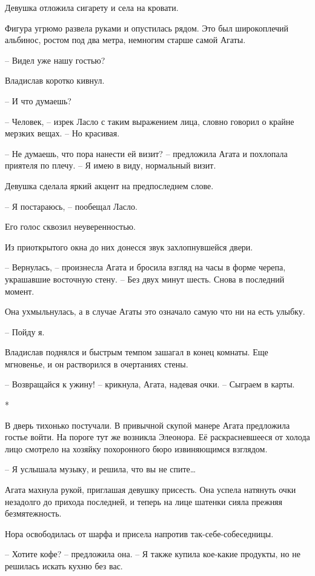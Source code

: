 \documentclass[
  a5paperpaper,
  DIV=11,
  numbers=noendperiod]{scrreprt}
\begin{document}
Девушка отложила сигарету и села на кровати.

Фигура угрюмо развела руками и опустилась рядом. Это был широкоплечий
альбинос, ростом под два метра, немногим старше самой Агаты.

-- Видел уже нашу гостью?

Владислав коротко кивнул.

-- И что думаешь?

-- Человек, -- изрек Ласло с таким выражением лица, словно говорил о
крайне мерзких вещах. -- Но красивая.

-- Не думаешь, что пора нанести ей визит? -- предложила Агата и
похлопала приятеля по плечу. -- Я имею в виду, нормальный визит.

Девушка сделала яркий акцент на предпоследнем слове.

-- Я постараюсь, -- пообещал Ласло.

Его голос сквозил неуверенностью.

Из приоткрытого окна до них донесся звук захлопнувшейся двери.

-- Вернулась, -- произнесла Агата и бросила взгляд на часы в форме
черепа, украшавшие восточную стену. -- Без двух минут шесть. Снова в
последний момент.

Она ухмыльнулась, а в случае Агаты это означало самую что ни на есть
улыбку.

-- Пойду я.

Владислав поднялся и быстрым темпом зашагал в конец комнаты. Еще
мгновенье, и он растворился в очертаниях стены.

-- Возвращайся к ужину! -- крикнула, Агата, надевая очки. -- Сыграем в
карты.

*

В дверь тихонько постучали. В привычной скупой манере Агата предложила
гостье войти. На пороге тут же возникла Элеонора. Её раскрасневшееся от
холода лицо смотрело на хозяйку похоронного бюро извиняющимся взглядом.

-- Я услышала музыку, и решила, что вы не спите\ldots{}

Агата махнула рукой, приглашая девушку присесть. Она успела натянуть
очки незадолго до прихода последней, и теперь на лице шатенки сияла
прежняя безмятежность.

Нора освободилась от шарфа и присела напротив так-себе-собеседницы.

-- Хотите кофе? -- предложила она. -- Я также купила кое-какие продукты,
но не решилась искать кухню без вас.
\end{document}
